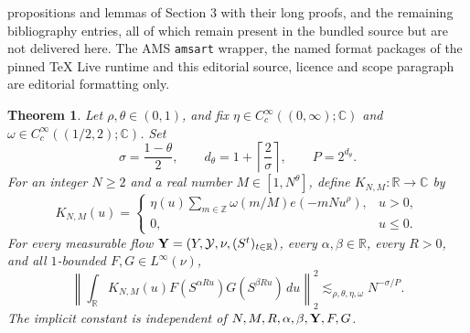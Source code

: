 \documentclass[10pt,a4paper]{amsart}
\newtheorem{thm}{Theorem}[section]
\newtheorem{prop}[thm]{Proposition}
\def \C {\mathbb C}
\def \Z {\mathbb Z}
\def \R {\mathbb R}
\def \Y {\mathcal{Y}}
\numberwithin{equation}{section}
\begin{document}
propositions and lemmas of Section 3 with their long proofs, and the remaining bibliography entries, all of which remain present in the bundled source but are not delivered here. The AMS \texttt{amsart} wrapper, the named format packages of the pinned TeX Live runtime and this editorial source, licence and scope paragraph are editorial formatting only.\par\smallskip
\setcounter{section}{3}
\setcounter{equation}{0}
\setcounter{cl}{0}
\setcounter{fact}{0}
\setcounter{step}{0}
\setcounter{thm}{0}
\begin{thm}\label{thm3-1}
Let $\rho,\theta\in(0,1)$, and fix
$\eta\in C_c^\infty((0,\infty);\C)$ and
$\omega\in C_c^\infty((1/2,2);\C)$. Set
\begin{equation}
 \sigma=\frac{1-\theta}{2},\qquad
 d_\theta=1+\left\lceil\frac2\sigma\right\rceil,
 \qquad P=2^{d_\theta}.
 \label{eq3-add-parameters}
\end{equation}
For an integer $N\ge2$ and a real number $M\in[1,N^\theta]$, define
$K_{N,M}:\R\to\C$ by
\begin{equation}
 K_{N,M}(u)=
 \begin{cases}
 \displaystyle\eta(u)\sum_{m\in\Z}\omega(m/M)e(-mNu^\rho),&u>0,\\[1mm]
 0,&u\le0.
 \end{cases}
 \label{eq3-add-kernel}
\end{equation}
For every measurable flow ${\bf Y}=(Y,\Y,\nu,(S^t)_{t\in\R})$,
every $\alpha,\beta\in\R$, every $R>0$, and all $1$-bounded
$F,G\in L^\infty(\nu)$,
\begin{equation}
 \left\|\int_\R K_{N,M}(u)
 F(S^{\alpha Ru})G(S^{\beta Ru})\,du\right\|_2^2
 \lesssim_{\rho,\theta,\eta,\omega}N^{-\sigma/P}.
 \label{eq3-add-main-bound}
\end{equation}
The implicit constant is independent of $N,M,R,\alpha,\beta,{\bf Y},F,G$.
\end{thm}

\setcounter{section}{3}
\setcounter{equation}{4}
\setcounter{cl}{0}
\setcounter{fact}{0}
\setcounter{step}{0}
\setcounter{thm}{1}
\begin{prop}\label[prop]{prop3:scalar}
Under the assumptions of \Cref{thm3-1}, for every real
$H\in(0,1]$,
\begin{equation}
 \left\|\int_\R K_{N,M}(u)
 F(S^{\alpha Ru})G(S^{\beta Ru})\,du\right\|_2^2
 \lesssim_{|I_0|}\frac1H\int_0^H
                \sup_{\xi\in\R}|\mathcal A_h(\xi)|\,dh.
 \label{eq3-add-spectral-reduction}
\end{equation}
\end{prop}
\end{document}

